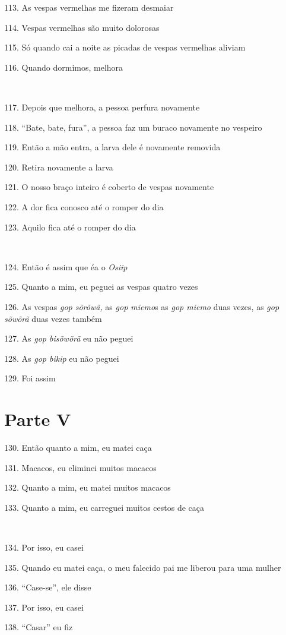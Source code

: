 113. As vespas vermelhas me fizeram desmaiar

114. Vespas vermelhas são muito dolorosas

115. Só quando cai a noite as picadas de vespas vermelhas aliviam

116. Quando dormimos, melhora

~

117. Depois que melhora, a pessoa perfura novamente

118. ``Bate, bate, fura'', a pessoa faz um buraco novamente no vespeiro

119. Então a mão entra, a larva dele é novamente removida

120. Retira novamente a larva

121. O nosso braço inteiro é coberto de vespas novamente

122. A dor fica conosco até o romper do dia

123. Aquilo fica até o romper do dia

~

124. Então é assim que éa o \emph{Osiip}

125. Quanto a mim, eu peguei as vespas quatro vezes

126. As vespas \emph{gop sõrõwã,} as \emph{gop miemo}s as \emph{gop miemo} duas vezes, as \emph{gop sõwõrã} duas vezes também

127. As \emph{gop bisõwõrã} eu não peguei

128. As \emph{gop bikip} eu não peguei

129. Foi assim

\section{Parte V}

130. Então quanto a mim, eu matei caça

131. Macacos, eu eliminei muitos macacos

132. Quanto a mim, eu matei muitos macacos

133. Quanto a mim, eu carreguei muitos cestos de caça

~

134. Por isso, eu casei

135. Quando eu matei caça, o meu falecido pai me liberou para uma mulher

136. ``Case-se'', ele disse

137. Por isso, eu casei

138. ``Casar'' eu fiz


